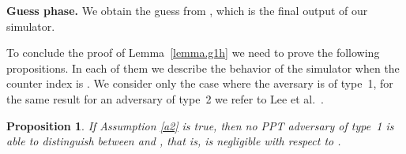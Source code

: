 \documentclass[a4paper,10pt]{article}
\newtheorem{proposition}{Proposition}
\newcommand{\game}[2]{}
\newcommand{\phase}[1]{\textbf{#1 phase.} \hspace{0pt}}
\newcommand{\typeone}{type~1}
\newcommand{\typetwo}{type~2}
\begin{document}
	\phase{Guess}
	We obtain the guess  from , which is the final output of our simulator.
	
	\vspace{0.5em} 

	To conclude the proof of Lemma~\ref{lemma.g1h} we need to prove the following propositions.
	In each of them we describe the behavior of the simulator when the counter index is . We consider only the case where the aversary is of \typeone{}, for the same result for an adversary of \typetwo{} we refer to Lee et al.~\cite{lee2013RSABE}.
	
	\begin{proposition}
		\label{prop.h1}
		If Assumption \ref{a2} is true, then no PPT adversary  of \typeone{} is able to distinguish between \game{H}{k,1} and \game{H}{k-1,2}, that is,  is negligible with respect to .
	\end{proposition}
\end{document}
